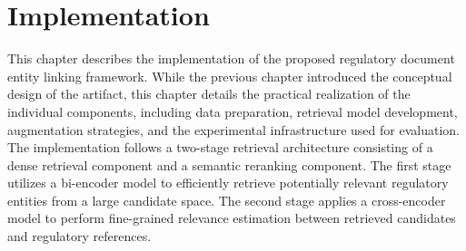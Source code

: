 \chapter{Implementation} 
This chapter describes the implementation of the proposed regulatory document entity linking framework. While the previous chapter introduced the conceptual design of the artifact, this chapter details the practical realization of the individual components, including data preparation, retrieval model development, augmentation strategies, and the experimental infrastructure used for evaluation. The implementation follows a two-stage retrieval architecture consisting of a dense retrieval component and a semantic reranking component. The first stage utilizes a bi-encoder model to efficiently retrieve potentially relevant regulatory entities from a large candidate space. The second stage applies a cross-encoder model to perform fine-grained relevance estimation between retrieved candidates and regulatory references.















% 
